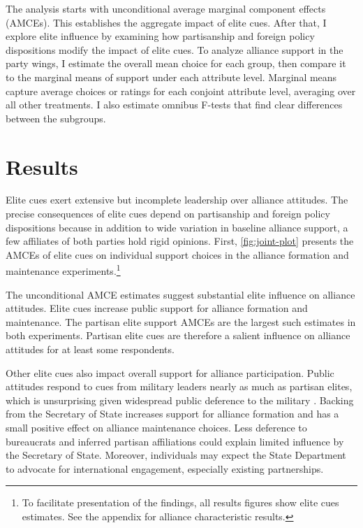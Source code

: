 \documentclass[12pt]{article}
\begin{document}
The analysis starts with unconditional average marginal component effects (AMCEs).
This establishes the aggregate impact of elite cues. 
After that, I explore elite influence by examining how partisanship and foreign policy dispositions modify the impact of elite cues. 
To analyze alliance support in the party wings, I estimate the overall mean choice for each group, then compare it to the marginal means of support under each attribute level.
Marginal means capture average choices or ratings for each conjoint attribute level, averaging over all other treatments. 
I also estimate omnibus F-tests \citep{Leeperetal2020} that find clear differences between the subgroups.  


\section{Results} 


Elite cues exert extensive but incomplete leadership over alliance attitudes.
The precise consequences of elite cues depend on partisanship and foreign policy dispositions because in addition to wide variation in baseline alliance support, a few affiliates of both parties hold rigid opinions. 
First, \autoref{fig:joint-plot} presents the AMCEs of elite cues on individual support choices in the alliance formation and maintenance experiments.\footnote{To facilitate presentation of the findings, all results figures show elite cues estimates. See the appendix for alliance characteristic results.}


The unconditional AMCE estimates suggest substantial elite influence on alliance attitudes. 
Elite cues increase public support for alliance formation and maintenance. 
The partisan elite support AMCEs are the largest such estimates in both experiments.
Partisan elite cues are therefore a salient influence on alliance attitudes for at least some respondents. 


Other elite cues also impact overall support for alliance participation. 
Public attitudes respond to cues from military leaders nearly as much as partisan elites, which is unsurprising given widespread public deference to the military \citep{Golbyetal2018}. 
Backing from the Secretary of State increases support for alliance formation and has a small positive effect on alliance maintenance choices. 
Less deference to bureaucrats and inferred partisan affiliations could explain limited influence by the Secretary of State. 
Moreover, individuals may expect the State Department to advocate for international engagement, especially existing partnerships.
\end{document}
